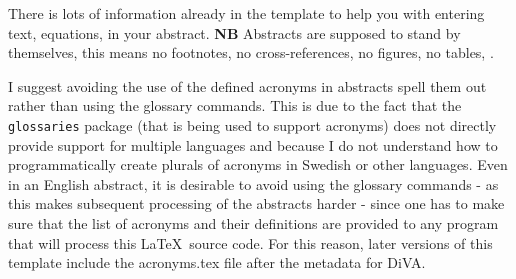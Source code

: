 \documentclass[examplethesis.tex]{subfiles}
\begin{document}
There is lots of information already in the template to help you with entering text, equations, \etc in your abstract. \textbf{NB} Abstracts are supposed to stand by themselves, this means no footnotes, no cross-references, no figures, no tables, \etc.

I suggest avoiding the use of the defined acronyms in abstracts \ie spell them out rather than using the glossary commands. This is due to the fact that the \texttt{glossaries} package (that is being used to support acronyms) does not directly provide support for multiple languages and because I do not understand how to programmatically create plurals of acronyms in Swedish or other languages. Even in an English abstract, it is desirable to avoid using the glossary commands - as this makes subsequent processing of the abstracts harder - since one has to make sure that the list of acronyms and their definitions are provided to any program that will process this \LaTeX\  source code. For this reason, later versions of this template include the acronyms.tex file after the metadata for DiVA.
\end{document}
